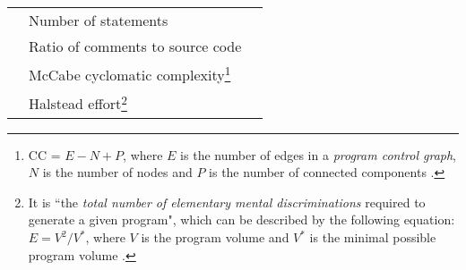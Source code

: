 \begin{longtable}{c X c}
& Number of statements & \cite{systematic, method-level, micro_interaction, how_and_why} \\
& Ratio of comments to source code & \cite{method-level, how_and_why} \\
& McCabe cyclomatic complexity\footnote{CC = $ E - N + P $, where $E$ is the number of edges in a \emph{program control graph}, $N$ is the number of nodes and $P$ is the number of connected components \cite{McCabe}.} & \cite{systematic, method-level, how_and_why} \\
& Halstead effort\footnote{It is ``the \emph{total number of elementary mental discriminations} required to generate a given program", which can be described by the following equation: $E = V^2/V^*$, where $V$ is the program volume and $V^*$ is the minimal possible program volume \cite[p. 47]{Halstead}.} & \cite{systematic} \\
\bottomrule
\end{longtable}